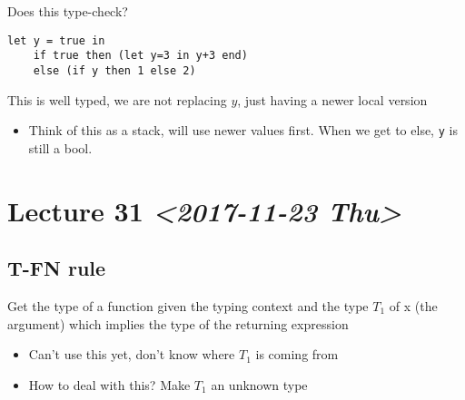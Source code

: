 \documentclass[11pt]{article}
\begin{document}
Does this type-check?
\begin{verbatim}
let y = true in
    if true then (let y=3 in y+3 end)
    else (if y then 1 else 2)

\end{verbatim}
This is well typed, we are not replacing \(y\), just having a newer local version
\begin{itemize}
\item Think of this as a stack, will use newer values first. When we get to else, \texttt{y} is still a bool.
\end{itemize}
\section{Lecture 31 \textit{<2017-11-23 Thu>}}
\label{sec:org22afaf5}
\subsection{T-FN rule}
\label{sec:orgf310569}
Get the type of a function given the typing context and the type \(T_1\) of x (the argument) which implies the type of the returning expression
\begin{itemize}
\item Can't use this yet, don't know where \(T_1\) is coming from
\item How to deal with this? Make \(T_1\) an unknown type
\end{itemize}
\end{document}
